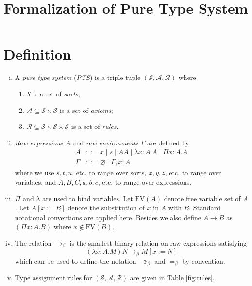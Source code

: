 \documentclass[oneside,a4paper]{article}
\title{\bf Formalization of Pure Type System}
\author{}
\date{}
\numberwithin{equation}{section}
\begin{document}
\maketitle

\section{Definition}
\begin{enumerate}[(i)]
\item A \emph{pure type system} (\emph{PTS}) is a triple tuple
  $(\mathcal{S},\mathcal{A},\mathcal{R})$ where

  \begin{enumerate}
  \item $\mathcal{S}$ is a set of \emph{sorts};
  \item $\mathcal{A}\subseteq \mathcal{S} \times \mathcal{S}$ is a set
    of \emph{axioms};
  \item
    $\mathcal{R}\subseteq \mathcal{S} \times \mathcal{S} \times
    \mathcal{S}$ is a set of \emph{rules}.
  \end{enumerate}

\item \emph{Raw expressions} $A$ and \emph{raw environments} $\Gamma$
  are defined by
  \begin{align*}
    A &::= x \mid s \mid AA \mid \lambda x:A.A \mid \Pi x:A.A\\
    \Gamma &::= \varnothing \mid \Gamma,x:A
  \end{align*}
  where we use $s,t,u$, etc. to range over sorts, $x,y,z$, etc. to
  range over variables, and $A,B,C,a,b,c$, etc. to range over
  expressions.

\item $\Pi$ and $\lambda$ are used to bind variables. Let
  $\mathrm{FV}(A)$ denote free variable set of $A$. Let $A[x:=B]$
  denote the substitution of $x$ in $A$ with $B$. Standard notational
  conventions are applied here. Besides we also define $A \to B$ as
  $(\Pi x:A.B)$ where $x \not \in \mathrm{FV}(B)$.

\item The relation $\to _ \beta$ is the smallest binary relation on
  raw expressions satisfying
  \[ (\lambda x:A.M)N \to _ \beta M[x:=N] \]
  which can be used to define the notation $\twoheadrightarrow_\beta$
  and $=_\beta$ by convention.

\item Type assignment rules for
  $(\mathcal{S},\mathcal{A},\mathcal{R})$ are given in Table
  \ref{fig:rules}.


\end{enumerate}
\end{document}
